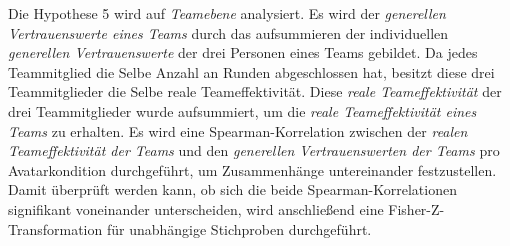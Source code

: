 \documentclass[a4paper,11pt]{article}%
\renewcommand{\\}{\vspace*{0.5\baselineskip} \newline}
\begin{document}
Die Hypothese 5 wird auf \textit{Teamebene} analysiert. Es wird der \textit{generellen Vertrauenswerte eines Teams} durch das aufsummieren der individuellen \textit{generellen Vertrauenswerte} der drei Personen eines Teams gebildet.
Da jedes Teammitglied die Selbe Anzahl an Runden abgeschlossen hat, besitzt diese drei Teammitglieder die Selbe reale Teameffektivität. Diese \textit{reale Teameffektivität} der drei Teammitglieder wurde aufsummiert, um die \textit{reale Teameffektivität eines Teams} zu erhalten.
Es wird eine Spearman-Korrelation zwischen der \textit{realen Teameffektivität der Teams} und den \textit{generellen Vertrauenswerten der Teams} pro Avatarkondition durchgeführt, um Zusammenhänge untereinander festzustellen.
Damit überprüft werden kann, ob sich die beide Spearman-Korrelationen signifikant voneinander unterscheiden, wird anschließend eine Fisher-Z-Transformation für unabhängige Stichproben durchgeführt.\\
\end{document}
